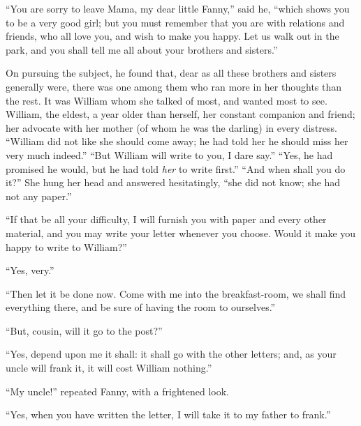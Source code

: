``You are sorry to leave Mama, my dear little Fanny,''
said he, ``which shows you to be a very good girl; but you
must remember that you are with relations and friends,
who all love you, and wish to make you happy.  Let us walk
out in the park, and you shall tell me all about your
brothers and sisters.''

On pursuing the subject, he found that, dear as all
these brothers and sisters generally were, there was one
among them who ran more in her thoughts than the rest.
It was William whom she talked of most, and wanted most
to see.  William, the eldest, a year older than herself,
her constant companion and friend; her advocate with her
mother (of whom he was the darling) in every distress.
``William did not like she should come away; he had told
her he should miss her very much indeed.''  ``But William will
write to you, I dare say.''  ``Yes, he had promised he would,
but he had told \emph{her} to write first.''  ``And when shall
you do it?''  She hung her head and answered hesitatingly,
``she did not know; she had not any paper.''

``If that be all your difficulty, I will furnish you
with paper and every other material, and you may write
your letter whenever you choose.  Would it make you
happy to write to William?''

``Yes, very.''

``Then let it be done now.  Come with me into the
breakfast-room, we shall find everything there,
and be sure of having the room to ourselves.''

``But, cousin, will it go to the post?''

``Yes, depend upon me it shall:  it shall go with the
other letters; and, as your uncle will frank it,
it will cost William nothing.''

``My uncle!'' repeated Fanny, with a frightened look.

``Yes, when you have written the letter, I will take it
to my father to frank.''

